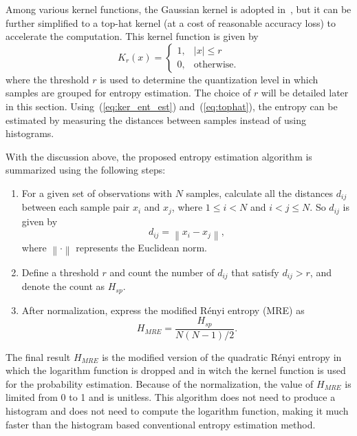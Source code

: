 \documentclass[12pt, draftclsnofoot, onecolumn]{IEEEtran}
\begin{document}
Among various kernel functions, the Gaussian kernel is adopted in~\cite{Principe2000a}, but it can be further simplified to a top-hat kernel (at a cost of reasonable accuracy loss) to accelerate the computation. 
This kernel function is given by
\begin{equation}
{\displaystyle K_{r}(x)={\begin{cases}1,&|x|\leq r\\0,&{\mbox{otherwise.}}\end{cases}}}
\label{eq:tophat}
\end{equation}
where the threshold \(r\) is used to determine the quantization level in which samples are grouped for entropy estimation.
The choice of \(r\) will be detailed later in this section.
% 
% 
Using~(\ref{eq:ker_ent_est}) and~(\ref{eq:tophat}), the entropy can be estimated by  measuring the distances between samples instead of using histograms.


With the discussion above, the proposed entropy estimation algorithm is summarized using the following steps:
\begin{enumerate}
\item For a given set of observations with $N$ samples, calculate all the distances \(d_{ij}\) between each sample pair \(x_i\) and \(x_j\), where \(1\le i<N\) and \( i<j \le N\). 
So \(d_{ij}\) is given by
 \begin{equation}
d_{ij}=\left\|x_i-x_j \right\|,
\label{eq:distance}
\end{equation}
where \(\left\| \cdot \right\|\) represents the Euclidean norm.
\item Define a threshold \(r\) and count the number of \(d_{ij}\) that satisfy $d_{ij}>r$, and denote the count as $H_{sp}$.
\item After normalization, express the modified R\'enyi entropy (MRE) as
\begin{equation}
H_{MRE}= \frac{ H_{sp}}{ N(N-1)/2}.
\label{eq:entorpy_ad}
\end{equation}
\end{enumerate}



The final result \(H_{MRE}\) is the modified version of the quadratic R\'enyi entropy in which the logarithm function is dropped and in witch the kernel function is used for the probability estimation.
Because of the normalization, the value of $H_{MRE}$ is limited from 0 to 1 and is unitless.
This algorithm does not need to produce a histogram and does not need to compute the logarithm function, making it much faster than the histogram based conventional entropy estimation method.
\end{document}
